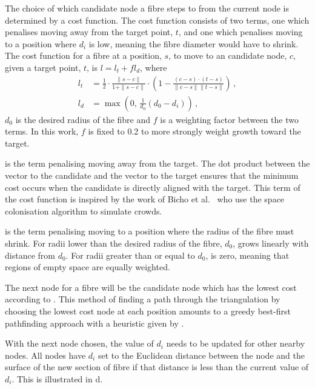 The choice of which candidate node a fibre steps to from the current node is determined by a cost function. 
The cost function consists of two terms, one which penalises moving away from the target point, $t$, and one which penalises moving to a position where $d_i$ is low, meaning the fibre diameter would have to shrink. The cost function for a fibre at a position, $s$, to move to an candidate node, $c$, given a target point, $t$, is $l = l_t + fl_d$,
where 
\begin{align}
l_t &= \frac{1}{2} \cdot \frac{\|s - c\|}{1 + \|s - c\|} \cdot \left(1 - \frac{(c -s)\cdot(t - s)}{\|c-s\|\|t-s\|}\right)\,,\label{eq:l_t}\\
l_d &= \max\left(0,\, \frac{1}{d_{0}} (d_0 - d_i)\right)\,,\label{eq:l_D}
\end{align}
$d_0$ is the desired radius of the fibre and $f$ is a weighting factor between the two terms. In this work, $f$ is fixed to 0.2 to more strongly weight growth toward the target.

 is the term penalising moving away from the target. The dot product between the vector to the candidate and the vector to the target ensures that the minimum cost occurs when the candidate is directly aligned with the target.
This term of the cost function is inspired by the work of Bicho et al.\ \cite{Bicho2012} who use the space colonisation algorithm \cite{Runions2005,Runions2007} to simulate crowds.

 is the term penalising moving to a position where the radius of the fibre must shrink. 
For radii lower than the desired radius of the fibre, $d_0$,  grows linearly with distance from $d_0$. 
For radii greater than or equal to $d_0$,  is zero, meaning that regions of empty space are equally weighted.

The next node for a fibre will be the candidate node which has the lowest cost according to .
This method of finding a path through the triangulation by choosing the lowest cost node at each position amounts to a greedy best-first pathfinding approach with a heuristic given by . 

With the next node chosen, the value of $d_i$ needs to be updated for other nearby nodes. 
All nodes have $d_i$ set to the Euclidean distance between the node and the surface of the new section of fibre if that distance is less than the current value of $d_i$. This is illustrated in d.

